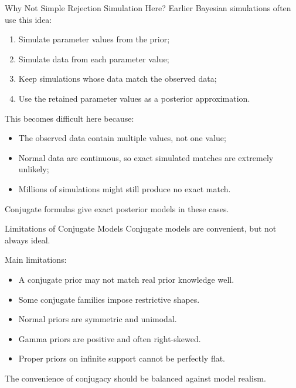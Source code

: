 \documentclass[aspectratio=43,11pt]{beamer}
\begin{document}
\begin{frame}{Why Not Simple Rejection Simulation Here?}
Earlier Bayesian simulations often use this idea:
\begin{enumerate}
  \item Simulate parameter values from the prior;
  \item Simulate data from each parameter value;
  \item Keep simulations whose data match the observed data;
  \item Use the retained parameter values as a posterior approximation.
\end{enumerate}

\medskip
This becomes difficult here because:
\begin{itemize}
  \item The observed data contain multiple values, not one value;
  \item Normal data are continuous, so exact simulated matches are extremely unlikely;
  \item Millions of simulations might still produce no exact match.
\end{itemize}

\medskip
Conjugate formulas give exact posterior models in these cases.
\end{frame}

\begin{frame}{Limitations of Conjugate Models}
Conjugate models are convenient, but not always ideal.

\medskip
Main limitations:
\begin{itemize}
  \item A conjugate prior may not match real prior knowledge well.
  \item Some conjugate families impose restrictive shapes.
  \item Normal priors are symmetric and unimodal.
  \item Gamma priors are positive and often right-skewed.
  \item Proper priors on infinite support cannot be perfectly flat.
\end{itemize}

\medskip
The convenience of conjugacy should be balanced against model realism.
\end{frame}
\end{document}
